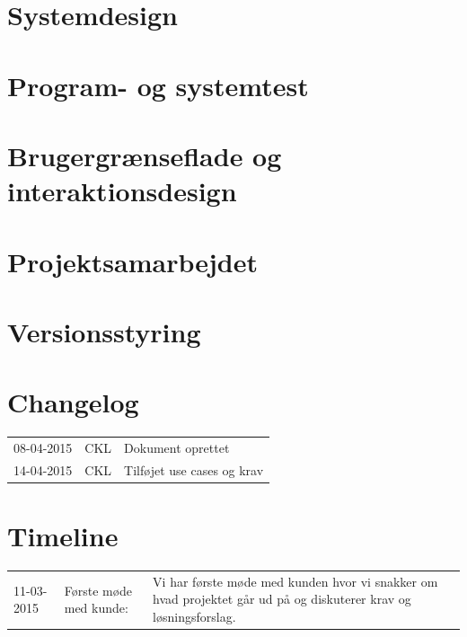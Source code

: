 \documentclass[12pt]{article}
\begin{document}
\section{Systemdesign}
\label{sec:systemdesign}

\section{Program- og systemtest}
\label{sec:program_og_systemtest}

\section{Brugergrænseflade og interaktionsdesign}

\section{Projektsamarbejdet}
\label{sec:projektsamarbejdet}

\appendix
\section{Versionsstyring}

\section{Changelog}
\begin{tabular}{l l l}
08-04-2015 & CKL & Dokument oprettet \\
14-04-2015 & CKL & Tilføjet use cases og krav \\
\end{tabular}

\section{Timeline}
\begin{tabular}{l l p{8cm}}
11-03-2015 & Første møde med kunde: & Vi har første møde med kunden hvor vi snakker om hvad projektet går ud på og diskuterer krav og løsningsforslag.
\end{tabular}


{}
\end{document}
